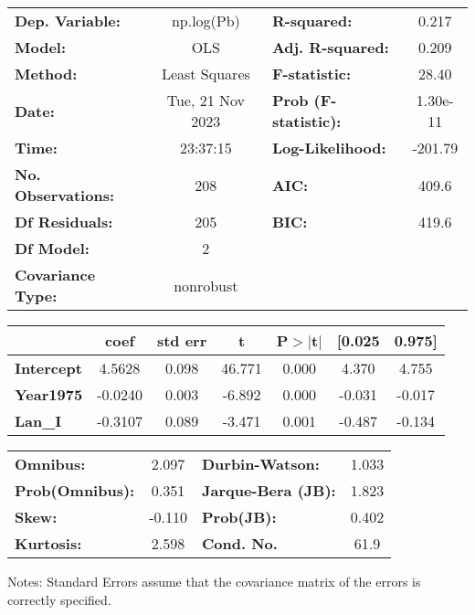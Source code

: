 \begin{center}
\begin{tabular}{lclc}
\toprule
\textbf{Dep. Variable:}    &    np.log(Pb)    & \textbf{  R-squared:         } &     0.217   \\
\textbf{Model:}            &       OLS        & \textbf{  Adj. R-squared:    } &     0.209   \\
\textbf{Method:}           &  Least Squares   & \textbf{  F-statistic:       } &     28.40   \\
\textbf{Date:}             & Tue, 21 Nov 2023 & \textbf{  Prob (F-statistic):} &  1.30e-11   \\
\textbf{Time:}             &     23:37:15     & \textbf{  Log-Likelihood:    } &   -201.79   \\
\textbf{No. Observations:} &         208      & \textbf{  AIC:               } &     409.6   \\
\textbf{Df Residuals:}     &         205      & \textbf{  BIC:               } &     419.6   \\
\textbf{Df Model:}         &           2      & \textbf{                     } &             \\
\textbf{Covariance Type:}  &    nonrobust     & \textbf{                     } &             \\
\bottomrule
\end{tabular}
\begin{tabular}{lcccccc}
                   & \textbf{coef} & \textbf{std err} & \textbf{t} & \textbf{P$> |$t$|$} & \textbf{[0.025} & \textbf{0.975]}  \\
\midrule
\textbf{Intercept} &       4.5628  &        0.098     &    46.771  &         0.000        &        4.370    &        4.755     \\
\textbf{Year1975}  &      -0.0240  &        0.003     &    -6.892  &         0.000        &       -0.031    &       -0.017     \\
\textbf{Lan\_I}    &      -0.3107  &        0.089     &    -3.471  &         0.001        &       -0.487    &       -0.134     \\
\bottomrule
\end{tabular}
\begin{tabular}{lclc}
\textbf{Omnibus:}       &  2.097 & \textbf{  Durbin-Watson:     } &    1.033  \\
\textbf{Prob(Omnibus):} &  0.351 & \textbf{  Jarque-Bera (JB):  } &    1.823  \\
\textbf{Skew:}          & -0.110 & \textbf{  Prob(JB):          } &    0.402  \\
\textbf{Kurtosis:}      &  2.598 & \textbf{  Cond. No.          } &     61.9  \\
\bottomrule
\end{tabular}
\end{center}

Notes: \newline
 [1] Standard Errors assume that the covariance matrix of the errors is correctly specified.